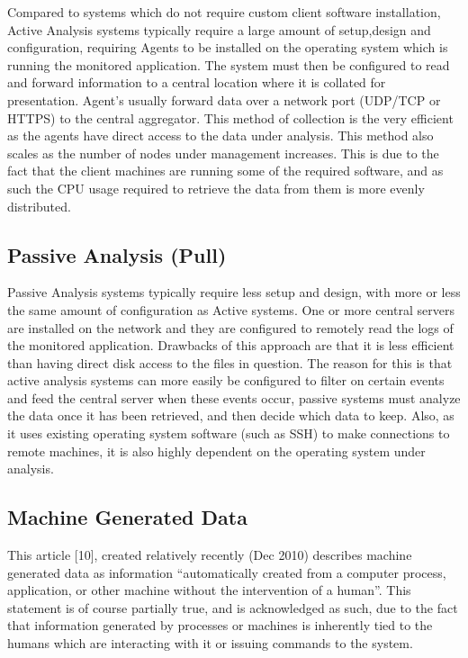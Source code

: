 \documentclass{llncs}
\begin{document}
Compared to systems which do not require custom client software installation, Active Analysis systems typically require a large amount of setup,design and configuration, requiring Agents to be installed on the operating system which is running the monitored application. The system must then be configured to read and forward information to a central location where it is collated for presentation. Agent’s usually forward data over a network port (UDP/TCP or HTTPS) to the central aggregator. This method of collection is the very efficient as the agents have direct access to the data under analysis. This method also scales as the number of nodes under management increases. This is due to the fact that the client machines are running some of the required software, and as such the CPU usage required to retrieve the data from them is more evenly distributed.

\subsection{Passive Analysis (Pull)}

Passive Analysis systems typically require less setup and design, with more or less the same amount of configuration as Active systems. One or more central servers are installed on the network and they are configured to remotely read the logs of the monitored application. Drawbacks of this approach are that it is less efficient than having direct disk access to the files in question. The reason for this is that active analysis systems can more easily be configured to filter on certain events and feed the central server when these events occur, passive systems must analyze the data once it has been retrieved, and then decide which data to keep. Also, as it uses existing operating system software (such as SSH) to make connections to remote machines, it is also highly dependent on the operating system under analysis.

%
\subsection{Machine Generated Data}
This article [10], created relatively recently (Dec 2010) describes machine generated data as information “automatically created from a computer process, application, or other machine without the intervention of a human”. This statement is of course partially true, and is acknowledged as such, due to the fact that information generated by processes or machines is inherently tied to the humans which are interacting with it or issuing commands to the system.
\end{document}
